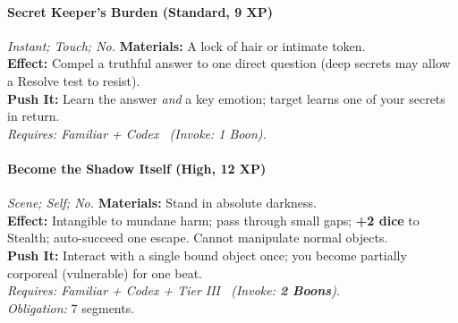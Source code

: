 \paragraph{Secret Keeper's Burden (Standard, 9 XP)} \emph{Instant; Touch; No.}
\textbf{Materials:} A lock of hair or intimate token.\\
\textbf{Effect:} Compel a truthful answer to one direct question (deep secrets may allow a Resolve test to resist).\\
\textbf{Push It:} Learn the answer \emph{and} a key emotion; target learns one of your secrets in return.\\
\emph{Requires: Familiar + Codex \ (\textit{Invoke:} 1 Boon).}

\paragraph{Become the Shadow Itself (High, 12 XP)} \emph{Scene; Self; No.}
\textbf{Materials:} Stand in absolute darkness.\\
\textbf{Effect:} Intangible to mundane harm; pass through small gaps; \textbf{+2 dice} to Stealth; auto-succeed one escape. Cannot manipulate normal objects.\\
\textbf{Push It:} Interact with a single bound object once; you become partially corporeal (vulnerable) for one beat.\\
\emph{Requires: Familiar + Codex + Tier III \ (\textit{Invoke:} \textbf{2 Boons}).}\\
\emph{Obligation:} 7 segments.
